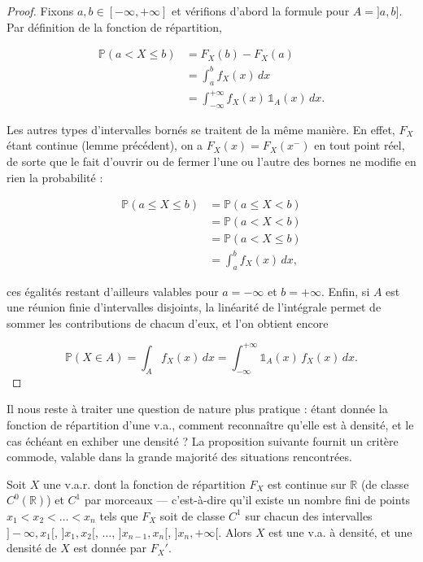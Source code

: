 \begin{proof}
Fixons $a, b \in [-\infty, +\infty]$ et vérifions d'abord la formule pour $A = ]a, b]$. Par définition de la fonction de répartition,

\begin{align*}
\mathbb{P}(a < X \leq b) &= F_X(b) - F_X(a) \\
&= \int_a^b f_X(x)\, dx \\
&= \int_{-\infty}^{+\infty} f_X(x)\, \mathbb{1}_A(x)\, dx.
\end{align*}

Les autres types d'intervalles bornés se traitent de la même manière. En effet, $F_X$ étant continue (lemme précédent), on a $F_X(x) = F_X(x^-)$ en tout point réel, de sorte que le fait d'ouvrir ou de fermer l'une ou l'autre des bornes ne modifie en rien la probabilité :

\begin{align*}
\mathbb{P}(a \leq X \leq b) &= \mathbb{P}(a \leq X < b) \\
&= \mathbb{P}(a < X < b) \\
&= \mathbb{P}(a < X \leq b)  \\
&= \int_a^b f_X(x)\, dx,
\end{align*}

ces égalités restant d'ailleurs valables pour $a = -\infty$ et $b = +\infty$. Enfin, si $A$ est une réunion finie d'intervalles disjoints, la linéarité de l'intégrale permet de sommer les contributions de chacun d'eux, et l'on obtient encore

$$
\mathbb{P}(X \in A) = \int_A f_X(x)\, dx = \int_{-\infty}^{+\infty} \mathbb{1}_A(x)\, f_X(x)\, dx.
$$
\end{proof}

Il nous reste à traiter une question de nature plus pratique : étant donnée la fonction de répartition d'une v.a., comment reconnaître qu'elle est à densité, et le cas échéant en exhiber une densité ? La proposition suivante fournit un critère commode, valable dans la grande majorité des situations rencontrées.

\medskip

\begin{mdframed}
\begin{proposition}
Soit $X$ une v.a.r. dont la fonction de répartition $F_X$ est continue sur $\mathbb{R}$ (de classe $C^0(\mathbb{R})$) et $C^1$ par morceaux — c'est-à-dire qu'il existe un nombre fini de points $x_1 < x_2 < \dots < x_n$ tels que $F_X$ soit de classe $C^1$ sur chacun des intervalles $]-\infty, x_1[$, $]x_1, x_2[$, $\dots$, $]x_{n-1}, x_n[$, $]x_n, +\infty[$. Alors $X$ est une v.a. à densité, et une densité de $X$ est donnée par $F_X'$.
\end{proposition}
\end{mdframed}

